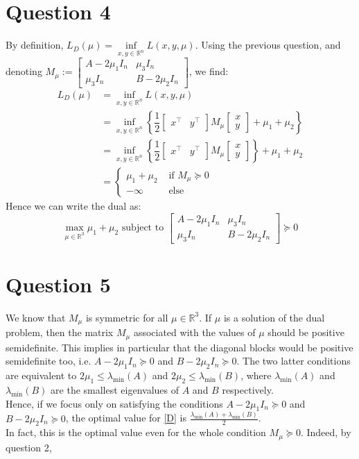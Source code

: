 \documentclass{article}
\newcommand{\R}{\mathbb{R}}
\newcommand{\tp}{^\top}
\begin{document}
\section*{Question 4}
By definition, $L_D(\mu)=\inf\limits_{x,y\in\R^n} L(x,y,\mu)$. Using the previous question, and denoting $M_\mu:=\begin{bmatrix} A-2\mu_1 I_n & \mu_3 I_n \\
\mu_3 I_n & B-2\mu_2 I_n \end{bmatrix}$, we find:
\begin{align*}
L_D(\mu)&=\inf\limits_{x,y\in\R^n} L(x,y,\mu) \\
&=\inf\limits_{x,y\in\R^n} \left\lbrace \dfrac{1}{2} \begin{bmatrix} x\tp & y\tp\end{bmatrix}M_\mu\begin{bmatrix} x \\ y \end{bmatrix} +\mu_1+\mu_2 \right\rbrace \\
&=\inf\limits_{x,y\in\R^n} \left\lbrace \dfrac{1}{2} \begin{bmatrix} x\tp & y\tp\end{bmatrix}M_\mu\begin{bmatrix} x \\ y \end{bmatrix} \right\rbrace+\mu_1+\mu_2   \\
&=\begin{cases} \mu_1+\mu_2 &\text{ if }M_\mu\succeq 0 \\ -\infty &\text{ else} \end{cases}
\end{align*}
Hence we can write the dual as:
\begin{equation*}\tag{D} \label{D}
\max_{\mu\in\R^3} \mu_1+\mu_2 \text{ subject to } \begin{bmatrix} A-2\mu_1 I_n & \mu_3 I_n \\
\mu_3 I_n & B-2\mu_2 I_n \end{bmatrix} \succeq 0
\end{equation*}

\section*{Question 5}
We know that $M_\mu$ is symmetric for all $\mu\in\R^3$. If $\mu$ is a solution of the dual problem, then the matrix $M_\mu$ associated with the values of $\mu$ should be positive semidefinite. This implies in particular that the diagonal blocks would be positive semidefinite too, i.e. $A-2\mu_1 I_n\succeq 0$ and $B-2\mu_2 I_n \succeq 0$. The two latter conditions are equivalent to $2\mu_1\leq \lambda_{\min} (A)$ and $2\mu_2\leq \lambda_{\min}(B)$, where  $\lambda_{\min} (A)$ and $\lambda_{\min} (B)$ are the smallest eigenvalues of $A$ and $B$ respectively.\\
Hence, if we focus only on satisfying the conditions  $A-2\mu_1 I_n\succeq 0$ and $B-2\mu_2 I_n \succeq 0$, the optimal value for \eqref{D} is $\frac{\lambda_{\min} (A)+\lambda_{\min} (B)}{2}$. \\
In fact, this is the optimal value even for the whole condition $M_\mu\succeq 0$. Indeed, by question 2,
\end{document}
